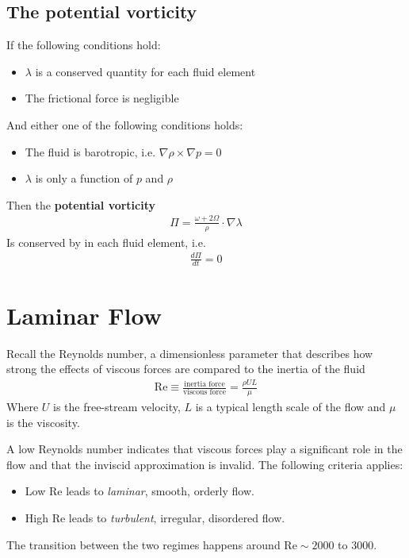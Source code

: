 \documentclass[a4paper, 12pt]{article}
\numberwithin{equation}{subsubsection}
\begin{document}
\subsection{The potential vorticity}
If the following conditions hold:
\begin{itemize}
	\item $\lambda$ is a conserved quantity for each fluid element
	\item The frictional force is negligible
\end{itemize}
And either one of the following conditions holds:
\begin{itemize}
	\item The fluid is barotropic, i.e. $\nabla \rho \times \nabla p = 0$
	\item $\lambda$ is only a function of $p$ and $\rho$
\end{itemize}
Then the \textbf{potential vorticity}
\begin{align}
	\Pi = \frac{\omega + 2 \Omega}{\rho} \cdot \nabla \lambda
\end{align}
Is conserved by in each fluid element, i.e.
\begin{align}
	\frac{d \Pi}{d t} = 0
\end{align}


\newpage
\section{Laminar Flow}
Recall the Reynolds number, a dimensionless parameter that describes how strong the effects of viscous forces are compared to the inertia of the fluid
\begin{align}
	\text{Re} \equiv \frac{\text{inertia force}}{\text{viscous force}} = \frac{\rho U L}{\mu}
\end{align}
Where $U$ is the free-stream velocity, $L$ is a typical length scale of the flow and $\mu$ is the viscosity.

A low Reynolds number indicates that viscous forces play a significant role in the flow and that the inviscid approximation is invalid. The following criteria applies:
\begin{itemize}
	\item Low $\text{Re}$ leads to \textit{laminar}, smooth, orderly flow. 
	\item High $\text{Re}$ leads to \textit{turbulent}, irregular, disordered flow.
\end{itemize}
The transition between the two regimes happens around $\text{Re} \sim 2000$ to 3000. 
\end{document}
